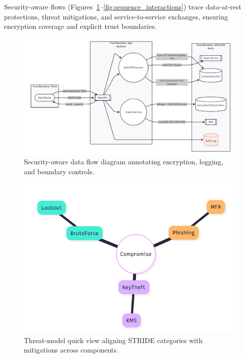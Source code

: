 \documentclass[12pt]{article}
\begin{document}
Security-aware flows (Figures~\ref{fig:security_flow}--\ref{fig:sequence_interactions}) trace data-at-rest protections, threat mitigations, and service-to-service exchanges, ensuring encryption coverage and explicit trust boundaries.

\begin{figure}[t]
  \centering
  \includegraphics[width=0.9\linewidth]{security_aware_data_flow.png}
  \caption{Security-aware data flow diagram annotating encryption, logging, and boundary controls.}
  \label{fig:security_flow}
\end{figure}

\begin{figure}[t]
  \centering
  \includegraphics[width=0.85\linewidth]{threat_model_quickview.png}
  \caption{Threat-model quick view aligning STRIDE categories with mitigations across components.}
  \label{fig:threat_model}
\end{figure}
\end{document}
